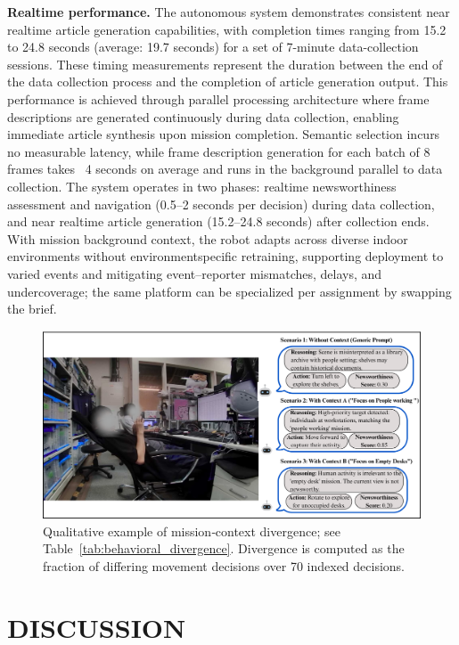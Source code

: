 \documentclass[letterpaper, 10 pt, conference]{ieeeconf}  %
\begin{document}
\textbf{Real\-time performance.} The au\-ton\-omous system demonstrates consistent near real\-time article generation capabilities, with completion times ranging from 15.2 to 24.8 seconds (average: 19.7 seconds) for a set of 7-minute data-collection sessions. These timing measurements represent the duration between the end of the data collection process and the completion of article generation output. This performance is achieved through parallel processing architecture where frame descriptions are generated continuously during data collection, enabling immediate article synthesis upon mission completion. Semantic selection incurs no measurable latency, while frame description generation for each batch of 8 frames takes ~4 seconds on average and runs in the background parallel to data collection. The system operates in two phases: real\-time newsworthi\-ness assessment and navigation (0.5–2 seconds per decision) during data collection, and near real\-time article generation (15.2–24.8 seconds) after collection ends. With mission background context, the robot adapts across diverse indoor environments without environment\-specific retraining, supporting deployment to varied events and mitigating event–reporter mismatches, delays, and undercoverage; the same platform can be specialized per assignment by swapping the brief.

\begin{figure}[!t]
\centering
\includegraphics[width=0.96\columnwidth]{figures/editing.png}
\caption{Qualitative example of mission‑context divergence; see Table~\ref{tab:behavioral_divergence}. Divergence is computed as the fraction of differing movement decisions over 70 indexed decisions.}
\label{fig:context_variation}
\end{figure}



\section{DISCUSSION}
\end{document}
